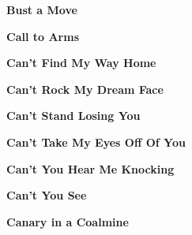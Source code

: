 \newline
\vspace{10pt} 
\begin{center}\textbf{Bust a Move}\end{center}
\newline
\vspace{10pt} 
\begin{center}\textbf{Call to Arms}\end{center}
\newline
\vspace{10pt} 
\begin{center}\textbf{Can't Find My Way Home}\end{center}
\newline
\vspace{10pt} 
\begin{center}\textbf{Can't Rock My Dream Face}\end{center}
\newline
\vspace{10pt} 
\begin{center}\textbf{Can't Stand Losing You}\end{center}
\newline
\vspace{10pt} 
\begin{center}\textbf{Can't Take My Eyes Off Of You}\end{center}
\newline
\vspace{10pt} 
\begin{center}\textbf{Can't You Hear Me Knocking}\end{center}
\newline
\vspace{10pt} 
\begin{center}\textbf{Can't You See}\end{center}
\newline
\vspace{10pt} 
\begin{center}\textbf{Canary in a Coalmine}\end{center}
\newline
